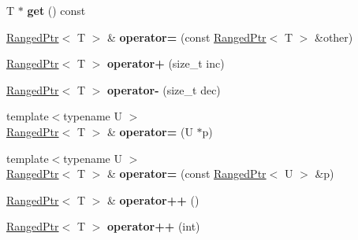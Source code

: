 \begin{DoxyCompactItemize}
\item 
\hypertarget{classmozilla_1_1_ranged_ptr_acbe4dea95d5dabd651e2c7ff81a8ea7e}{T $\ast$ {\bfseries get} () const }\label{classmozilla_1_1_ranged_ptr_acbe4dea95d5dabd651e2c7ff81a8ea7e}

\item 
\hypertarget{classmozilla_1_1_ranged_ptr_a4a447b8dd2fb8f1b317d8505058b4c8d}{\hyperlink{classmozilla_1_1_ranged_ptr}{Ranged\-Ptr}$<$ T $>$ \& {\bfseries operator=} (const \hyperlink{classmozilla_1_1_ranged_ptr}{Ranged\-Ptr}$<$ T $>$ \&other)}\label{classmozilla_1_1_ranged_ptr_a4a447b8dd2fb8f1b317d8505058b4c8d}

\item 
\hypertarget{classmozilla_1_1_ranged_ptr_ace7bf00cf6764086f8065d2bce4dea6b}{\hyperlink{classmozilla_1_1_ranged_ptr}{Ranged\-Ptr}$<$ T $>$ {\bfseries operator+} (size\-\_\-t inc)}\label{classmozilla_1_1_ranged_ptr_ace7bf00cf6764086f8065d2bce4dea6b}

\item 
\hypertarget{classmozilla_1_1_ranged_ptr_a1682c6006f751a1328efaec8532060f9}{\hyperlink{classmozilla_1_1_ranged_ptr}{Ranged\-Ptr}$<$ T $>$ {\bfseries operator-\/} (size\-\_\-t dec)}\label{classmozilla_1_1_ranged_ptr_a1682c6006f751a1328efaec8532060f9}

\item 
\hypertarget{classmozilla_1_1_ranged_ptr_ace41aefd3f051e12ce50258e0e76a4c7}{{\footnotesize template$<$typename U $>$ }\\\hyperlink{classmozilla_1_1_ranged_ptr}{Ranged\-Ptr}$<$ T $>$ \& {\bfseries operator=} (U $\ast$p)}\label{classmozilla_1_1_ranged_ptr_ace41aefd3f051e12ce50258e0e76a4c7}

\item 
\hypertarget{classmozilla_1_1_ranged_ptr_ae41e14602fa1e56688e8b9fec49b089d}{{\footnotesize template$<$typename U $>$ }\\\hyperlink{classmozilla_1_1_ranged_ptr}{Ranged\-Ptr}$<$ T $>$ \& {\bfseries operator=} (const \hyperlink{classmozilla_1_1_ranged_ptr}{Ranged\-Ptr}$<$ U $>$ \&p)}\label{classmozilla_1_1_ranged_ptr_ae41e14602fa1e56688e8b9fec49b089d}

\item 
\hypertarget{classmozilla_1_1_ranged_ptr_a253c74dda1aff199aed8dae448e7838d}{\hyperlink{classmozilla_1_1_ranged_ptr}{Ranged\-Ptr}$<$ T $>$ \& {\bfseries operator++} ()}\label{classmozilla_1_1_ranged_ptr_a253c74dda1aff199aed8dae448e7838d}

\item 
\hypertarget{classmozilla_1_1_ranged_ptr_a2d39b893d33f2c48d1b905304ac45cf3}{\hyperlink{classmozilla_1_1_ranged_ptr}{Ranged\-Ptr}$<$ T $>$ {\bfseries operator++} (int)}\label{classmozilla_1_1_ranged_ptr_a2d39b893d33f2c48d1b905304ac45cf3}


\end{DoxyCompactItemize}
